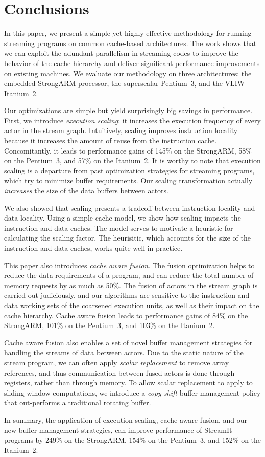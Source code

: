 \section{Conclusions}
\label{sec:conclusion}

In this paper, we present a simple yet highly effective methodology
for running streaming programs on common cache-based architectures.
The work shows that we can exploit the adundant parallelism in
streaming codes to improve the behavior of the cache hierarchy and
deliver significant performance improvements on existing machines. We
evaluate our methodology on three architectures: the embedded
StrongARM processor, the superscalar Pentium~3, and the VLIW Itanium~2.

Our optimizations are simple but yield surprisingly big savings in
performance. First, we introduce {\it execution scaling}: it 
increases the execution frequency of every actor in the stream
graph. Intuitively, scaling improves instruction  locality because
it increases the amount of reuse from the instruction
cache. Concomitantly, it leads to performance gains of 145\% on the
StrongARM, 58\% on the Pentium~3, and 57\% on the Itanium~2.
It is worthy to note that execution scaling is a departure from
past optimization strategies for streaming programs, which try to
minimize buffer requirements. Our scaling transformation actually {\it
increases} the size of the data buffers between actors.

We also showed that scaling presents a tradeoff between 
instruction locality and data locality. Using a simple cache
model, we show how scaling impacts the instruction and data
caches. The model serves to motivate a heuristic for calculating the
scaling factor. The heurisitic, which accounts for the size of the
instruction and data caches, works quite well in practice.

This paper also introduces {\it cache aware fusion}. The fusion
optimization helps to reduce the data requirements of a program, and
can reduce the total number of memory requests by as much as 50\%. The
fusion of actors in the stream graph is carried out judiciously, and
our algorithms are sensitive to the instruction and data working sets
of the coarsened execution units, as well as their impact on the cache
hierarchy. Cache aware fusion leads to performance gains of 84\% on
the StrongARM, 101\% on the Pentium~3, and 103\% on the Itanium~2.

Cache aware fusion also enables a set of novel buffer management
strategies for handling the streams of data between actors. Due to the
static nature of the stream program, we can often apply {\it scalar
  replacement} to remove array references, and thus communication
between fused actors is done through registers, rather than through
memory.  To allow scalar replacement to apply to sliding window 
computations, we introduce a {\it copy-shift} buffer management policy
that out-performs a traditional rotating buffer.

In summary, the application of execution scaling, cache aware fusion, and our
new buffer management strategies, can improve performance of
StreamIt programs by 249\% on the StrongARM, 154\% on the Pentium~3,
and 152\% on the Itanium~2.
